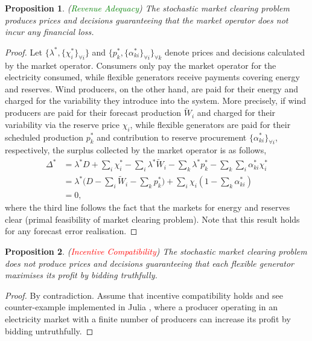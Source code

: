 \documentclass{article}
\newtheorem{proposition}{Proposition}
\begin{document}
\begin{proposition}
(\textcolor{green}{Revenue Adequacy}) The stochastic market clearing problem produces prices and decisions guaranteeing that the market operator does not incur any financial loss.
\end{proposition}
\begin{proof}
Let $\{\lambda^*, \{\chi_i^*\}_{\forall i}\}$ and $\{p_k^*, \{\alpha_{ki}^*\}_{\forall i}\}_{\forall k}$ denote prices and decisions calculated by the market operator. Consumers only pay the market operator for the electricity consumed, while flexible generators receive payments covering energy and reserves. Wind producers, on the other hand, are paid for their energy and charged for the variability they introduce into the system. More precisely, if wind producers are paid for their forecast production $\tilde{W}_i$ and charged for their variability via the reserve price $\chi_i$, while flexible generators are paid for their scheduled production $p_k^*$ and contribution to reserve procurement $\{\alpha_{ki}^*\}_{\forall i}$, respectively, the surplus collected by the market operator is as follows,
\begin{align*}
\Delta^* &= \lambda^*D + \sum_i \chi_i^* - \sum_i \lambda^*\tilde{W}_i - \sum_k \lambda^*p_k^* - \sum_k \sum_i \alpha_{ki}^* \chi_i^*\\
&= \lambda^*\big(D - \sum_i \tilde{W}_i - \sum_k p_k^*\big) + \sum_i \chi_i (1 - \sum_k \alpha_{ki}^*)\\
&= 0,
\end{align*}
where the third line follows the fact that the markets for energy and reserves clear (primal feasibility of market clearing problem). Note that this result holds for any forecast error realisation.
\end{proof}

\begin{proposition}
(\textcolor{red}{Incentive Compatibility}) The stochastic market clearing problem does not produce prices and decisions guaranteeing that each flexible generator maximises its profit by bidding truthfully.
\end{proposition}
\begin{proof}
By contradiction. Assume that incentive compatibility holds and see counter-example implemented in Julia \cite{SMER2022}, where a producer operating in an electricity market with a finite number of producers can increase its profit by bidding untruthfully.
\end{proof}
\end{document}
